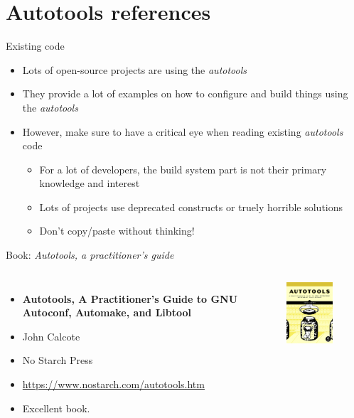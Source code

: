 \section{Autotools references}

\begin{frame}{Existing code}
  \begin{itemize}
  \item Lots of open-source projects are using the {\em autotools}
  \item They provide a lot of examples on how to configure and build
    things using the {\em autotools}
  \item However, make sure to have a critical eye when reading
    existing {\em autotools} code
    \begin{itemize}
    \item For a lot of developers, the build system part is not their
      primary knowledge and interest
    \item Lots of projects use deprecated constructs or truely
      horrible solutions
    \item Don't copy/paste without thinking!
    \end{itemize}
  \end{itemize}
\end{frame}

\begin{frame}{Book: {\em Autotools, a practitioner's guide}}
  \begin{columns}
    \begin{itemize}
    \item {\bf Autotools, A Practitioner's Guide to GNU Autoconf, Automake, and Libtool}
    \item John Calcote
    \item No Starch Press
    \item \url{https://www.nostarch.com/autotools.htm}
    \item Excellent book.
    \end{itemize}
    \includegraphics[width=0.6\textwidth]{slides/autotools-references/autotools-book.png}
  \end{columns}
\end{frame}

